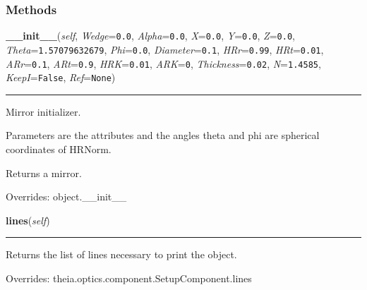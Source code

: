 
  \subsubsection{Methods}

    \vspace{0.5ex}

\hspace{.8\funcindent}\begin{boxedminipage}{\funcwidth}

    \raggedright \textbf{\_\_init\_\_}(\textit{self}, \textit{Wedge}={\tt 0.0}, \textit{Alpha}={\tt 0.0}, \textit{X}={\tt 0.0}, \textit{Y}={\tt 0.0}, \textit{Z}={\tt 0.0}, \textit{Theta}={\tt 1.57079632679}, \textit{Phi}={\tt 0.0}, \textit{Diameter}={\tt 0.1}, \textit{HRr}={\tt 0.99}, \textit{HRt}={\tt 0.01}, \textit{ARr}={\tt 0.1}, \textit{ARt}={\tt 0.9}, \textit{HRK}={\tt 0.01}, \textit{ARK}={\tt 0}, \textit{Thickness}={\tt 0.02}, \textit{N}={\tt 1.4585}, \textit{KeepI}={\tt False}, \textit{Ref}={\tt None})

    \vspace{-1.5ex}

    \rule{\textwidth}{0.5\fboxrule}
\setlength{\parskip}{2ex}
    Mirror initializer.

    Parameters are the attributes and the angles theta and phi are 
    spherical coordinates of HRNorm.

    Returns a mirror.

\setlength{\parskip}{1ex}
      Overrides: object.\_\_init\_\_

    \end{boxedminipage}

    \vspace{0.5ex}

\hspace{.8\funcindent}\begin{boxedminipage}{\funcwidth}

    \raggedright \textbf{lines}(\textit{self})

    \vspace{-1.5ex}

    \rule{\textwidth}{0.5\fboxrule}
\setlength{\parskip}{2ex}
    Returns the list of lines necessary to print the object.

\setlength{\parskip}{1ex}
      Overrides: theia.optics.component.SetupComponent.lines

    \end{boxedminipage}

